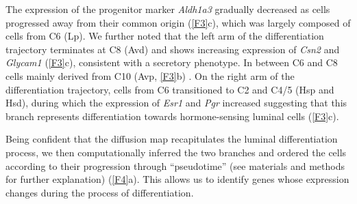 \documentclass[titlepage, 12pt, oneside]{amsart}
\begin{document}
The expression of the progenitor marker \textit{Aldh1a3} gradually decreased as cells progressed away from their common origin (\autoref{F3}c), which was largely composed of cells from C6 (Lp).  
We further noted that the left arm of the differentiation trajectory terminates at C8 (Avd) and shows increasing expression of \textit{Csn2} and \textit{Glycam1} (\autoref{F3}c), consistent with a secretory phenotype.
In between C6 and C8  cells mainly derived from C10 (Avp, \autoref{F3}b) .
On the right arm of the differentiation trajectory, cells from C6 transitioned to C2 and C4/5 (Hsp and Hsd), during which the expression of \textit{Esr1} and \textit{Pgr} increased suggesting that this branch represents differentiation towards hormone-sensing luminal cells (\autoref{F3}c).

Being confident that the diffusion map recapitulates the luminal differentiation process, we then computationally inferred the two branches and ordered the cells according to their progression through ``pseudotime''\autocite{Haghverdi2016} (see materials and methods for further explanation) (\autoref{F4}a).
This allows us to identify genes whose expression changes during the process of differentiation.\\
\end{document}
